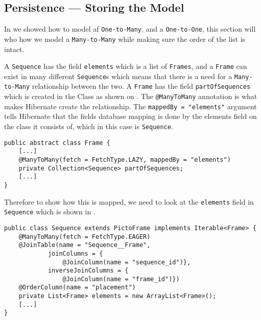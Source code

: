 \subsection{Persistence --- Storing the Model}
In  we showed how to model af \texttt{One-to-Many}, and a \texttt{One-to-One}, this section will who how we model a \texttt{Many-to-Many} while making sure the order of the list is intact.

A \texttt{Sequence} has the field \texttt{elements} which is a list of \texttt{Frames}, and a \texttt{Frame} can exist in many different \texttt{Sequence}s which means that there is a need for a \texttt{Many-to-Many} relationship between the two.
A \texttt{Frame} has the field \texttt{partOfSequences} which is created in the Class as shown on .
The \texttt{@ManyToMany} annotation is what makes Hibernate create the relationship.
The \texttt{mappedBy = "elements"} argument tells Hibernate that the fields database mapping is done by the elements field on the class it consists of, which in this case is \texttt{Sequence}.

\begin{lstlisting}[float, floatplacement=h, caption={The field partOfSequences in the \texttt{Frame} class. \texttt{[...]} denotes omitted code.},label={lst:frame-sequence}]
public abstract class Frame {
	[...]
    @ManyToMany(fetch = FetchType.LAZY, mappedBy = "elements")
    private Collection<Sequence> partOfSequences;
    [...]
}
\end{lstlisting}

Therefore to show how this is mapped, we need to look at the \texttt{elements} field in \texttt{Sequence} which is shown in .

\begin{lstlisting}[float, floatplacement=h, caption={The field elements in the \texttt{Sequence} class. \texttt{[...]} denotes omitted code.},label={lst:sequnce-frame}]
public class Sequence extends PictoFrame implements Iterable<Frame> {
    @ManyToMany(fetch = FetchType.EAGER)
    @JoinTable(name = "Sequence__Frame",
            joinColumns = {
                @JoinColumn(name = "sequence_id")},
            inverseJoinColumns = {
                @JoinColumn(name = "frame_id")})
    @OrderColumn(name = "placement")
    private List<Frame> elements = new ArrayList<Frame>();
    [...]
}
\end{lstlisting}

